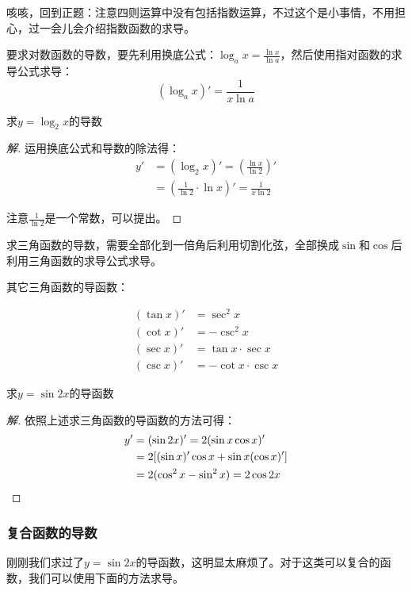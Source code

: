 咳咳，回到正题：注意四则运算中没有包括指数运算，不过这个是小事情，不用担心，过一会儿会介绍指数函数的求导。

\noindent\dotfill

要求对数函数的导数，要先利用换底公式：$\log_ax=\frac{\ln x}{\ln a}$，然后使用指对函数的求导公式求导：
\[(\log_ax)'=\frac{1}{x\ln a}\]

\begin{example}
	求$y=\log_2x$的导数
\end{example}
\begin{proof}[解]
	运用换底公式和导数的除法得：
	\[\begin{aligned}
		y'&=(\log_2x)'=(\frac{\ln x}{\ln2})' \\
		  &=(\frac{1}{\ln2}\cdot\ln x)'=\frac{1}{x\ln2}
	\end{aligned}\]

	注意$\frac{1}{\ln2}$是一个常数，可以提出。
\end{proof}

\noindent\dotfill

求三角函数的导数，需要全部化到一倍角后利用切割化弦，全部换成$\sin$和$\cos$后利用三角函数的求导公式求导。

其它三角函数的导函数：

\[
	\begin{aligned}
		(\tan x)'&=\sec^2x \\
		(\cot x)'&=-\csc^2x \\
		(\sec x)'&=\tan x\cdot\sec x \\
		(\csc x)'&=-\cot x\cdot\csc x
	\end{aligned}
\]

\begin{example}
	求$y=\sin2x$的导函数
\end{example}
\begin{proof}[解]
	依照上述求三角函数的导函数的方法可得：
	\[\begin{aligned}
		y'&=(\sin2x)'=2(\sin x\cos x)' \\
		  &=2[(\sin x)'\cos x+\sin x(\cos x)'] \\
		  &=2(\cos^2x-\sin^2x)=2\cos2x
	\end{aligned}\qedhere\]
\end{proof}

\subsubsection{复合函数的导数}
刚刚我们求过了$y=\sin2x$的导函数，这明显太麻烦了。对于这类可以复合的函数，我们可以使用下面的方法求导。

